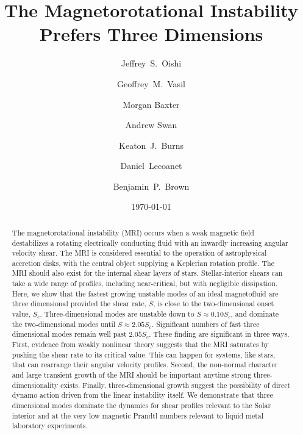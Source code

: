 \documentclass[aps,prl,reprint,superscriptaddress]{revtex4-1}
\begin{document}
\title{The Magnetorotational Instability Prefers Three Dimensions}

\author{Jeffrey~S.~Oishi}

\author{Geoffrey~M.~Vasil}
\author{Morgan Baxter}
\author{Andrew Swan}
\author{Keaton~J.~Burns}
\author{Daniel~Lecoanet}
\author{Benjamin~P.~Brown}

\date{\today}

\begin{abstract}
The magnetorotational instability (MRI) occurs when a weak magnetic field destabilizes a rotating electrically conducting fluid with an inwardly increasing angular velocity shear.
The MRI is considered essential to the operation of astrophysical accretion disks, with the central object supplying a Keplerian rotation profile.
The MRI should also exist for the internal shear layers of stars.
Stellar-interior shears can take a wide range of profiles, including near-critical, but with negligible dissipation. 
Here, we show that the fastest growing unstable modes of an ideal magnetofluid are three dimensional provided the shear rate, $S$, is close to the two-dimensional onset value, $S_c$.
Three-dimensional modes are unstable down to $S \approx 0.10 S_c$, and dominate the two-dimensional modes until $S \approx 2.05 S_c$.
Significant numbers of fast three dimensional modes remain well past $2.05 S_{c}$. 
These finding are significant in three ways. 
First, evidence from weakly nonlinear theory suggests that the MRI saturates by pushing the shear rate to its critical value. 
This can happen for systems, like stars, that can rearrange their angular velocity profiles.
Second, the non-normal character and large transient growth of the MRI should be important anytime strong three-dimensionality exists.
Finally, three-dimensional growth suggest the possibility of direct dynamo action driven from the linear instability itself.
We demonstrate that three dimensional modes dominate the dynamics for shear profiles relevant to the Solar interior and at the very low magnetic Prandtl numbers relevant to liquid metal laboratory experiments.
\end{abstract}
\end{document}
